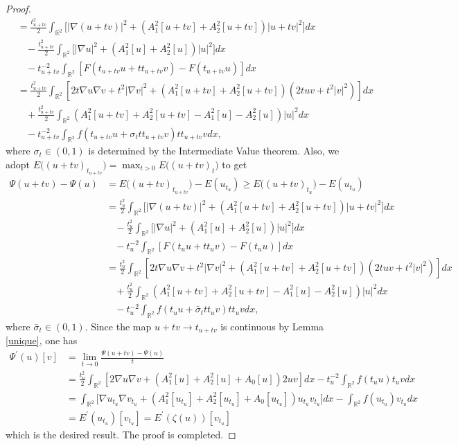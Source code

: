 \documentclass[11pt]{amsart}
\numberwithin{equation}{section}
\theoremstyle{definition}
\newcommand{\R}{\mathbb{R}}
\begin{document}
\begin{proof}
\begin{align*}
  &=  \frac{t_{u+tv}^2}{2}\int_{\R^2}\big[|\nabla(u+tv)|^2+(A^2_1[u+tv]+A^2_2[u+tv] )|u+tv|^2]dx\\
&\ \ \ \  -\frac{t_{u+tv}^2}{2}\int_{\R^2}\big[|\nabla u|^2+(A_1^2[u] +A_2^2[u] )|u|^2 \big]dx\\
&\ \ \ \  -t_{u+tv}^{-2}\int_{\R^2}[F(t_{u+tv} u+tt_{u+tv}v )-F(t_{u+tv} u)]dx\\
&=\frac{t_{u+tv}^2}{2}\int_{\R^2}[2t\nabla u\nabla v+t^2|\nabla v|^2+(A_1^2[u+tv]+A_2^2[u+tv])(2tuv+t^2|v|^2)]dx\\
&\ \ \ \  +\frac{t_{u+tv}^2}{2}\int_{\R^2}(A_1^2[u+tv]+A_2^2[u+tv]-A_1^2[u]-A_2^2[u])|u|^2dx\\
&\ \ \ \  -t_{u+tv}^{-2}\int_{\R^2}f(t_{u+tv} u+  \sigma_t tt_{u+tv}v )tt_{u+tv}vdx,
\end{align*}
where $\sigma_t\in(0,1)$ is determined by the Intermediate Value theorem. Also, we adopt
  $E\big( (u+tv)_{t_{u+tv}} \big)=\max_{t>0}E\big( (u+tv)_{t}\big)$ to get
\begin{align*}
\Psi(u+tv)-\Psi (u) & =E\big( (u+tv)_{t_{u+tv}} \big)-E(u_{t_u})
\geq E\big( (u+tv)_{t_{u}}\big)-E(u_{t_{u}}) \\
  &=  \frac{t_{u}^2}{2}\int_{\R^2}\big[|\nabla(u+tv)|^2+(A^2_1[u+tv]+A^2_2[u+tv] )|u+tv|^2]dx\\
&\ \ \ \  -\frac{t_{u}^2}{2}\int_{\R^2}\big[|\nabla u|^2+(A_1^2[u] +A_2^2[u] )|u|^2 \big]dx\\
&\ \ \ \  -t_{u}^{-2}\int_{\R^2}[F(t_{u} u+tt_{u}v )-F(t_{u} u)]dx\\
&=\frac{t_{u}^2}{2}\int_{\R^2}[2t\nabla u\nabla v+t^2|\nabla v|^2+(A_1^2[u+tv]+A_2^2[u+tv])(2tuv+t^2|v|^2)]dx\\
&\ \ \ \  +\frac{t_{u}^2}{2}\int_{\R^2}(A_1^2[u+tv]+A_2^2[u+tv]-A_1^2[u]-A_2^2[u])|u|^2dx\\
&\ \ \ \  -t_{u}^{-2}\int_{\R^2}f(t_{u} u+  \bar{\sigma}_t tt_{u}v )tt_{u}vdx,
\end{align*}
where $\bar{\sigma}_t\in(0,1)$.
Since the map $u+tv\to t_{u+tv}$ is continuous by Lemma \ref{unique}, one has
\begin{align*}
\Psi^\prime(u)[v]&=\lim_{t\to0}\frac{\Psi(u+tv)-\Psi (u)}{t} \\
& =\frac{t_{u}^2}{2}\int_{\R^2}[2\nabla u\nabla v+(A_1^2[u]+A_2^2[u]+A_0[u])2uv]dx
 -t_{u}^{-2}\int_{\R^2}f(t_{u} u)t_{u}vdx\\
&=
\int_{\R^2} \big[\nabla u_{t_u} \nabla v_{t_u}
+(A_1^2[u_{t_u}]+A_2^2[u_{t_u}]+A_0[u_{t_u}])u_{t_u}v_{t_u}\big]dx - \int_{\R^2}f( u_{t_u})v_{t_u}dx\\
&=E^\prime({u_{t_u}})[v_{t_u}]=E^\prime(\zeta(u))[v_{t_u}]
\end{align*}
which is the desired result. The proof is completed.
\end{proof}
\end{document}
